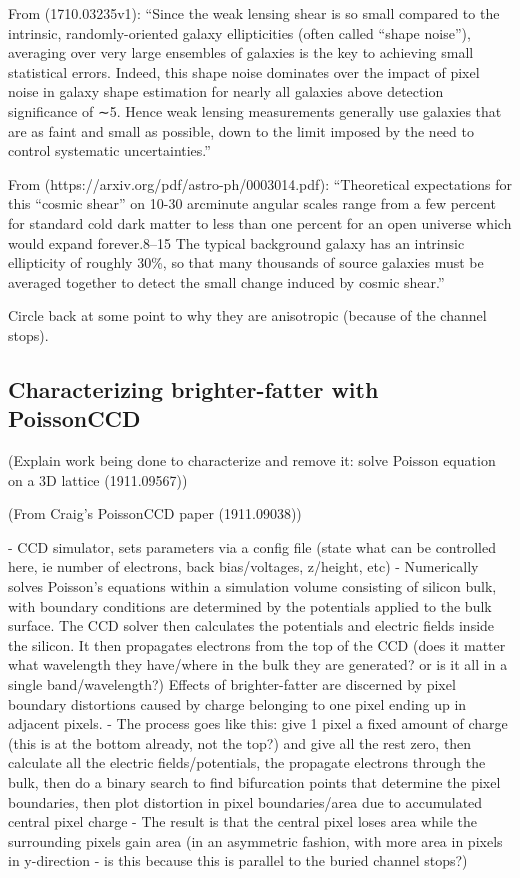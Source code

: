 From (1710.03235v1): ``Since the weak lensing shear is so small compared to the intrinsic, randomly-oriented galaxy ellipticities (often called “shape noise”), averaging over very large ensembles of galaxies is the key to achieving small statistical errors. Indeed, this shape noise dominates over the impact of pixel noise in galaxy shape estimation for nearly all galaxies above detection significance of ∼5. Hence weak lensing measurements generally use galaxies that are as faint and small as possible, down to the limit imposed by the need to control systematic uncertainties.''

From (https://arxiv.org/pdf/astro-ph/0003014.pdf): ``Theoretical expectations for this “cosmic shear” on 10-30 arcminute angular scales range from a few percent for standard cold dark matter to less than one percent for an open universe which would expand forever.8–15 The typical background galaxy has an intrinsic ellipticity of roughly 30\%, so that many thousands of source galaxies must be averaged together to detect the small change induced by cosmic shear.''

Circle back at some point to why they are anisotropic (because of the channel stops).

\subsection{Characterizing brighter-fatter with PoissonCCD}

(Explain work being done to characterize and remove it: solve Poisson equation on a 3D lattice (1911.09567))

(From Craig's PoissonCCD paper (1911.09038))

- CCD simulator, sets parameters via a config file (state what can be controlled here, ie number of electrons, back bias/voltages, z/height, etc)
- Numerically solves Poisson's equations within a simulation volume consisting of silicon bulk, with boundary conditions are determined by the potentials applied to the bulk surface. The CCD solver then calculates the potentials and electric fields inside the silicon. It then propagates electrons from the top of the CCD (does it matter what wavelength they have/where in the bulk they are generated? or is it all in a single band/wavelength?) Effects of brighter-fatter are discerned by pixel boundary distortions caused by charge belonging to one pixel ending up in adjacent pixels. 
- The process goes like this: give 1 pixel a fixed amount of charge (this is at the bottom already, not the top?) and give all the rest zero, then calculate all the electric fields/potentials, the propagate electrons through the bulk, then do a binary search to find bifurcation points that determine the pixel boundaries, then plot distortion in pixel boundaries/area due to accumulated central pixel charge
- The result is that the central pixel loses area while the surrounding pixels gain area (in an asymmetric fashion, with more area in pixels in y-direction - is this because this is parallel to the buried channel stops?)



